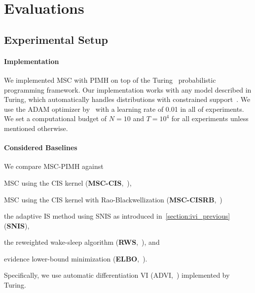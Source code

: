 

\vspace{-0.05in}
\section{Evaluations}\label{section:eval}
\subsection{Experimental Setup}
\paragraph{Implementation}
We implemented MSC with PIMH on top of the Turing~\citep{ge2018t} probabilistic programming framework.
Our implementation works with any model described in Turing, which automatically handles distributions with constrained support~\citep{JMLR:v18:16-107}.
We use the ADAM optimizer by~\citet{kingma_adam_2017} with a learning rate of 0.01 in all of experiments.
We set a computational budget of \(N=10\) and \(T=10^4\) for all experiments unless mentioned otherwise.

\vspace{-0.1in}
\paragraph{Considered Baselines}
We compare MSC-PIMH against
\begin{enumerate*}[label=\textbf{(\roman*)}]
  \item  MSC using the CIS kernel (\textbf{MSC-CIS},~\citealt{NEURIPS2020_b2070693}), 
  \item  MSC using the CIS kernel with Rao-Blackwellization (\textbf{MSC-CISRB},~\citealt{NEURIPS2020_b2070693})
  \item the adaptive IS method using SNIS as introduced in~\cref{section:ivi_previous} (\textbf{SNIS}),
  \item the reweighted wake-sleep algorithm (\textbf{RWS},~\citealt{DBLP:journals/corr/BornscheinB14}), and  
  \item evidence lower-bound minimization (\textbf{ELBO},~\citealt{pmlr-v33-ranganath14}).
\end{enumerate*}
Specifically, we use automatic differentiation VI (ADVI,~\citealt{JMLR:v18:16-107}) implemented by Turing.

